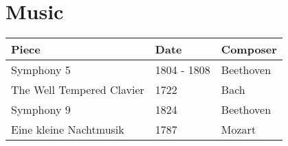\documentclass{article}
\begin{document}
\section{Music}
\begin{table}[H]
	\centering
	\begin{tabularx}{\textwidth}{ X X X }
		Piece & Date & Composer \\
		\hline
		Symphony 5 & 1804 - 1808 & Beethoven \\
		The Well Tempered Clavier & 1722 & Bach \\
		Symphony 9 & 1824 & Beethoven \\
		Eine kleine Nachtmusik & 1787 & Mozart \\
	\end{tabularx}
\end{table}
\end{document}
